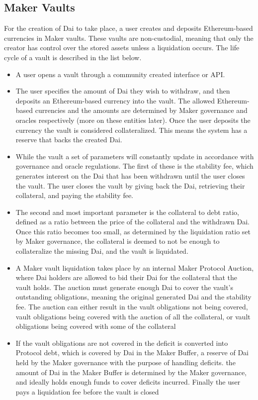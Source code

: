 \documentclass[bsc,frontabs,singlespacing,parskip,deptreport]{infthesis}
\begin{document}
    \subsection{Maker Vaults}
    \smallbreak \noindent
    For the creation of Dai to take place, a user creates and deposits Ethereum-based currencies in Maker vaults. These vaults are non-custodial, meaning that only the creator has control over the stored assets unless a liquidation occurs.  The life cycle of a vault is described in the list below.
    \begin{itemize}
        \item A user opens a vault through a community created interface or API.   
        \item The user specifies the amount of Dai they wish to withdraw, and then deposits an Ethereum-based currency into the vault. The allowed Ethereum-based currencies and the amounts are determined by Maker governance and oracles respectively (more on these entities later). Once the user deposits the currency the vault is considered collateralized. This means the system has a reserve that backs the created Dai. 
        \item While the vault a set of parameters will constantly update in accordance with governance and oracle regulations. The first of these is the stability fee, which generates interest on the Dai that has been withdrawn until the user closes the vault. The user closes the vault by giving back the Dai, retrieving their collateral, and paying the stability fee. 
        \item The second and most important parameter is the collateral to debt ratio, defined as a ratio between the price of the collateral and the withdrawn Dai. Once this ratio becomes too small, as determined by the liquidation ratio set by Maker governance, the collateral is deemed to not be enough to collateralize the missing Dai, and the vault is liquidated.
        \item A Maker vault liquidation takes place by an internal Maker Protocol Auction, where Dai holders are allowed to bid their Dai for the collateral that the vault holds. The auction must generate enough Dai to cover the vault's outstanding obligations, meaning the original generated Dai and the stability fee. The auction can either result in the vault obligations not being covered, vault obligations being covered with the auction of all the collateral, or vault obligations being covered with some of the collateral 
        \item If the vault obligations are not covered in the deficit is converted into Protocol debt, which is covered by Dai in the Maker Buffer, a reserve of Dai held by the Maker governance with the purpose of handling deficits. the amount of Dai in the Maker Buffer is determined by the Maker governance, and ideally holds enough funds to cover deficits incurred. Finally the user pays a liquidation fee before the vault is closed

\end{itemize}
\end{document}
